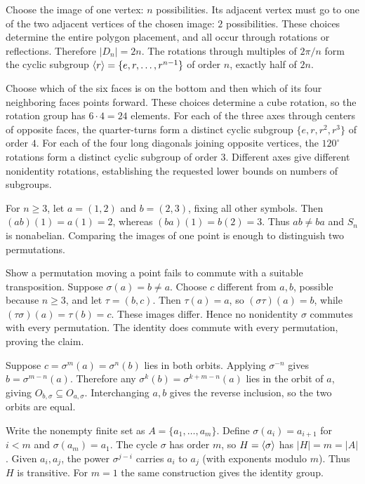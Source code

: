 Choose the image of one vertex: $n$ possibilities. Its adjacent vertex must go to one of the two adjacent vertices of the chosen image: $2$ possibilities. These choices determine the entire polygon placement, and all occur through rotations or reflections. Therefore $|D_n|=2n$. The rotations through multiples of $2\pi/n$ form the cyclic subgroup $\langle r\rangle=\{e,r,\ldots,r^{n-1}\}$ of order $n$, exactly half of $2n$.

Choose which of the six faces is on the bottom and then which of its four neighboring faces points forward. These choices determine a cube rotation, so the rotation group has $6\cdot4=24$ elements. For each of the three axes through centers of opposite faces, the quarter-turns form a distinct cyclic subgroup $\{e,r,r^2,r^3\}$ of order $4$. For each of the four long diagonals joining opposite vertices, the $120^\circ$ rotations form a distinct cyclic subgroup of order $3$. Different axes give different nonidentity rotations, establishing the requested lower bounds on numbers of subgroups.

For $n\ge3$, let $a=(1,2)$ and $b=(2,3)$, fixing all other symbols. Then $(ab)(1)=a(1)=2$, whereas $(ba)(1)=b(2)=3$. Thus $ab\ne ba$ and $S_n$ is nonabelian. Comparing the images of one point is enough to distinguish two permutations.

\idea Show a permutation moving a point fails to commute with a suitable transposition.
Suppose $\sigma(a)=b\ne a$. Choose $c$ different from $a,b$, possible because $n\ge3$, and let $\tau=(b,c)$. Then $\tau(a)=a$, so $(\sigma\tau)(a)=b$, while $(\tau\sigma)(a)=\tau(b)=c$. These images differ. Hence no nonidentity $\sigma$ commutes with every permutation. The identity does commute with every permutation, proving the claim.

Suppose $c=\sigma^m(a)=\sigma^n(b)$ lies in both orbits. Applying $\sigma^{-n}$ gives $b=\sigma^{m-n}(a)$. Therefore any $\sigma^k(b)=\sigma^{k+m-n}(a)$ lies in the orbit of $a$, giving $O_{b,\sigma}\subseteq O_{a,\sigma}$. Interchanging $a,b$ gives the reverse inclusion, so the two orbits are equal.

Write the nonempty finite set as $A=\{a_1,\ldots,a_m\}$. Define $\sigma(a_i)=a_{i+1}$ for $i<m$ and $\sigma(a_m)=a_1$. The cycle $\sigma$ has order $m$, so $H=\langle \sigma\rangle$ has $|H|=m=|A|$. Given $a_i,a_j$, the power $\sigma^{j-i}$ carries $a_i$ to $a_j$ (with exponents modulo $m$). Thus $H$ is transitive. For $m=1$ the same construction gives the identity group.

